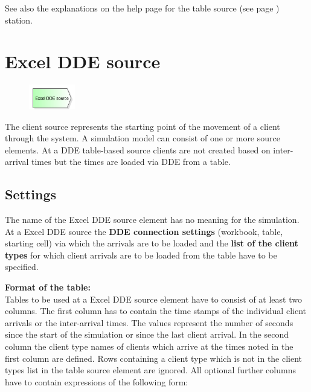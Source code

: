See also the explanations on the help page for the table source (see page \pageref{ref:ModelElementSourceTable}) station.


\section{Excel DDE source}
\label{ref:ModelElementSourceDDE}

\begin{figure}
\vspace{-22pt}
\includegraphics[width=2cm]{imageModelElementSourceDDE.png}
\vspace{-22pt}
\end{figure}

The client source represents the starting point of the movement of a client through the system.
A simulation model can consist of one or more source elements.
At a DDE table-based source clients are not created based on inter-arrival times but the
times are loaded via DDE from a table.

\subsection*{Settings}

The name of the Excel DDE source element has no meaning for the simulation.
At a Excel DDE source the \textbf{DDE connection settings}
(workbook, table, starting cell) via which the arrivals are to be loaded and the
\textbf{list of the client types} for which client
arrivals are to be loaded from the table have to be specified.

\textbf{Format of the table:}~\\
Tables to be used at a Excel DDE source element have to consist of at least two columns.
The first column has to contain the time stamps of the individual client arrivals
or the inter-arrival times. The values represent the number of seconds since the
start of the simulation or since the last client arrival.
In the second column the client type names of clients which arrive at the times
noted in the first column are defined. Rows containing a client type which is
not in the client types list in the table source element are ignored.
All optional further columns have to contain expressions of the following form:

